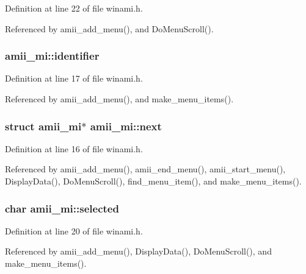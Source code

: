 Definition at line 22 of file winami.\+h.



Referenced by amii\+\_\+add\+\_\+menu(), and Do\+Menu\+Scroll().

\hypertarget{structamii__mi_ad856ed93a149eeb875438a1870a556fe}{
\subsubsection[{identifier}]{ amii\+\_\+mi\+::identifier}}\label{structamii__mi_ad856ed93a149eeb875438a1870a556fe}


Definition at line 17 of file winami.\+h.



Referenced by amii\+\_\+add\+\_\+menu(), and make\+\_\+menu\+\_\+items().

\hypertarget{structamii__mi_a2046365b8a73513492596c98a5d30452}{
\subsubsection[{next}]{\setlength{\rightskip}{0pt plus 5cm}struct {\bf amii\+\_\+mi}$\ast$ amii\+\_\+mi\+::next}}\label{structamii__mi_a2046365b8a73513492596c98a5d30452}


Definition at line 16 of file winami.\+h.



Referenced by amii\+\_\+add\+\_\+menu(), amii\+\_\+end\+\_\+menu(), amii\+\_\+start\+\_\+menu(), Display\+Data(), Do\+Menu\+Scroll(), find\+\_\+menu\+\_\+item(), and make\+\_\+menu\+\_\+items().

\hypertarget{structamii__mi_a47a93b904054888bb7a94309a192f01a}{
\subsubsection[{selected}]{\setlength{\rightskip}{0pt plus 5cm}char amii\+\_\+mi\+::selected}}\label{structamii__mi_a47a93b904054888bb7a94309a192f01a}


Definition at line 20 of file winami.\+h.



Referenced by amii\+\_\+add\+\_\+menu(), Display\+Data(), Do\+Menu\+Scroll(), and make\+\_\+menu\+\_\+items().

